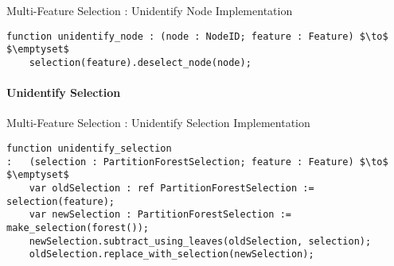 \begin{stulisting}[H]
\caption{Multi-Feature Selection : Unidentify Node Implementation}
\begin{lstlisting}[style=Default]
function unidentify_node : (node : NodeID; feature : Feature) $\to$ $\emptyset$
	selection(feature).deselect_node(node);
\end{lstlisting}
\end{stulisting}

\paragraph{Unidentify Selection}

\begin{stulisting}[H]
\caption{Multi-Feature Selection : Unidentify Selection Implementation}
\begin{lstlisting}[style=Default]
function unidentify_selection
:	(selection : PartitionForestSelection; feature : Feature) $\to$ $\emptyset$
	var oldSelection : ref PartitionForestSelection := selection(feature);
	var newSelection : PartitionForestSelection := make_selection(forest());
	newSelection.subtract_using_leaves(oldSelection, selection);
	oldSelection.replace_with_selection(newSelection);
\end{lstlisting}
\end{stulisting}

